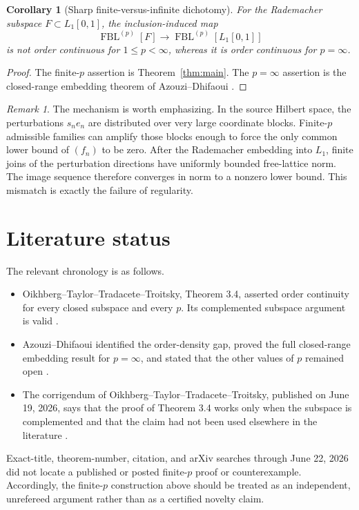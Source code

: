 \documentclass[11pt]{article}
\newtheorem{corollary}[theorem]{Corollary}
\theoremstyle{remark}
\newtheorem{remark}[theorem]{Remark}
\newcommand{\FBL}[2]{\operatorname{FBL}^{(#1)}[#2]}
\begin{document}
\begin{corollary}[Sharp finite-versus-infinite dichotomy]\label{cor:sharp}
For the Rademacher subspace \(F\subset L_1[0,1]\), the inclusion-induced map
\[
  \FBL{p}{F}\longrightarrow\FBL{p}{L_1[0,1]}
\]
is not order continuous for \(1\le p<\infty\), whereas it is order
continuous for \(p=\infty\).
\end{corollary}

\begin{proof}
The finite-\(p\) assertion is Theorem~\ref{thm:main}.  The
\(p=\infty\) assertion is the closed-range embedding theorem of
Azouzi--Dhifaoui \cite[Theorem~11]{AD}.
\end{proof}

\begin{remark}
The mechanism is worth emphasizing.  In the source Hilbert space, the
perturbations \(s_ne_n\) are distributed over very large coordinate blocks.
Finite-\(p\) admissible families can amplify those blocks enough to force the
only common lower bound of \((f_n)\) to be zero.  After the Rademacher
embedding into \(L_1\), finite joins of the perturbation directions have
uniformly bounded free-lattice norm.  The image sequence therefore converges
in norm to a nonzero lower bound.  This mismatch is exactly the failure of
regularity.
\end{remark}

\section{Literature status}

The relevant chronology is as follows.
\begin{itemize}
\item Oikhberg--Taylor--Tradacete--Troitsky, Theorem 3.4, asserted order
continuity for every closed subspace and every \(p\).  Its complemented
subspace argument is valid \cite{OTTT,Corr}.
\item Azouzi--Dhifaoui identified the order-density gap, proved the full
closed-range embedding result for \(p=\infty\), and stated that the other
values of \(p\) remained open \cite{AD}.
\item The corrigendum of Oikhberg--Taylor--Tradacete--Troitsky, published on
June 19, 2026, says that the proof of Theorem 3.4 works only when the
subspace is complemented and that the claim had not been used elsewhere in
the literature \cite{Corr}.
\end{itemize}

Exact-title, theorem-number, citation, and arXiv searches through June 22,
2026 did not locate a published or posted finite-\(p\) proof or counterexample.
Accordingly, the finite-\(p\) construction above should be treated as an
independent, unrefereed argument rather than as a certified novelty claim.
\end{document}
